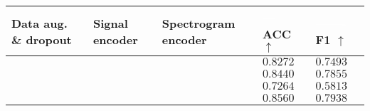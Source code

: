 \begin{tabular}{>{\centering\arraybackslash}p{}>{\centering\arraybackslash}p{}>{\centering\arraybackslash}p{}>{\raggedright\arraybackslash}p{}>{\raggedright\arraybackslash}p{}}
    \hline
	Data aug. \& dropout  & Signal encoder & Spectrogram encoder & \textcolor{white}{---} ACC $\uparrow$ & \textcolor{white}{-------} F1 $\uparrow$ \\
	\hline
	\textcolor{red}{\xmark} & \textcolor{tud3d}{\cmark} & \textcolor{tud3d}{\cmark} & $0.8272$ & $0.7493$ \\
	\textcolor{tud3d}{\cmark} & \textcolor{red}{\xmark} & \textcolor{tud3d}{\cmark} & $0.8440$ & $0.7855$ \\
	\textcolor{tud3d}{\cmark} & \textcolor{tud3d}{\cmark} & \textcolor{red}{\xmark} & $0.7264$ & $0.5813$ \\
	\textcolor{tud3d}{\cmark} & \textcolor{tud3d}{\cmark} & \textcolor{tud3d}{\cmark} & $\mathbf{0.8560}$ & $\mathbf{0.7938}$ \\
	\hline
\end{tabular}